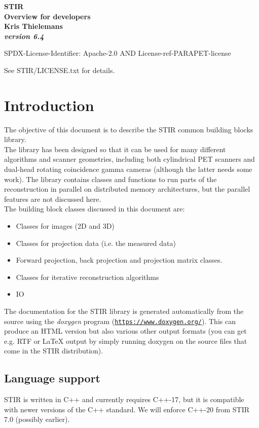 \documentclass{article}
\def\R2Lurl#1#2{\mbox{\href{#1}{\tt #2}}}
\begin{document}
\begin{center}
\textbf{{\huge STIR \\
Overview for developers}}\\
\textbf{Kris Thielemans}\\
\textbf{\textit{version 6.4}}

\end{center}

SPDX-License-Identifier: Apache-2.0 AND License-ref-PARAPET-license

See STIR/LICENSE.txt for details.

\tableofcontents


\section{
Introduction}

The objective of this document is to describe the STIR common 
building blocks library.\\
The library has been designed so that it can be used for many 
different algorithms and scanner geometries, including both cylindrical 
PET scanners and dual-head rotating coincidence gamma cameras 
(although the latter needs some work). The library contains classes 
and functions to run parts of the reconstruction in parallel 
on distributed memory architectures, but the parallel features 
are not discussed here.\\
The building block classes discussed in this document are:
\begin{itemize}
\item
Classes for images (2D and 3D)
\item 
Classes for projection data (i.e. the measured data)
\item 
Forward projection, back projection and projection matrix classes.
\item 
Classes for iterative reconstruction algorithms
\item IO
\end{itemize}

The documentation
for the STIR library is generated automatically from the source 
using the \textit{doxygen} program (\R2Lurl{https://www.doxygen.org/ }{https://www.doxygen.org/}). 
This can produce an HTML version but also various other output 
formats (you can get e.g. RTF or LaTeX output by simply running 
doxygen on the source files that come in the STIR distribution). 

\subsection{Language support}
STIR is written in C++ and currently requires C++-17, but it is compatible with newer versions of the C++ standard.
We will enforce C++-20 from STIR 7.0 (possibly earlier).
\end{document}
